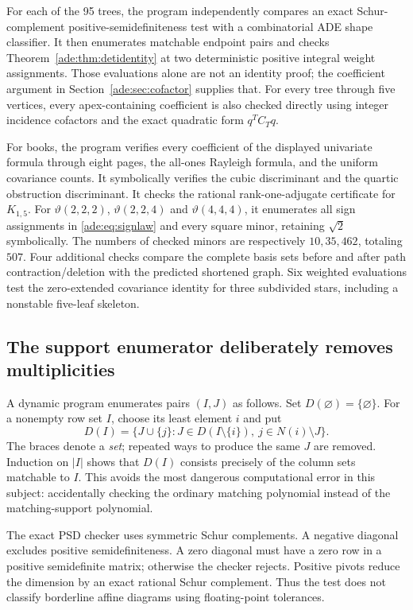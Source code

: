 \documentclass[11pt]{article}
\numberwithin{equation}{section}
\theoremstyle{definition}
\begin{document}
For each of the 95 trees, the program independently compares an exact
Schur-complement positive-semidefiniteness test with a combinatorial ADE
shape classifier.  It then enumerates matchable endpoint pairs and checks
Theorem~\ref{ade:thm:detidentity} at two deterministic positive integral
weight assignments.  Those evaluations alone are not an identity proof;
the coefficient argument in Section~\ref{ade:sec:cofactor} supplies that.
For every tree through five vertices, every apex-containing coefficient
is also checked directly using integer incidence cofactors and the exact
quadratic form $q^TC_Tq$.

For books, the program verifies every coefficient of the displayed
univariate formula through eight pages, the all-ones Rayleigh formula,
and the uniform covariance counts.  It symbolically verifies the cubic
discriminant and the quartic obstruction discriminant.  It checks the
rational rank-one-adjugate certificate for $K_{1,5}$.
For $\vartheta(2,2,2)$, $\vartheta(2,2,4)$ and $\vartheta(4,4,4)$, it enumerates
all sign assignments in \eqref{ade:eq:signlaw} and every square minor,
retaining $\sqrt2$ symbolically.  The numbers of checked minors are
respectively $10,35,462$, totaling $507$.
Four additional checks compare the complete basis sets before and after
path contraction/deletion with the predicted shortened graph.  Six
weighted evaluations test the zero-extended covariance identity for
three subdivided stars, including a nonstable five-leaf skeleton.

\subsection{The support enumerator deliberately removes multiplicities}

A dynamic program enumerates pairs $(I,J)$ as follows.  Set
$D(\varnothing)=\{\varnothing\}$.  For a nonempty row set $I$, choose its
least element $i$ and put
\begin{equation}
 D(I)=\{J\cup\{j\}:J\in D(I\setminus\{i\}),\ j\in N(i)\setminus J\}.
 \label{ade:eq:dp}
\end{equation}
The braces denote a \emph{set}; repeated ways to produce the same $J$
are removed.  Induction on $|I|$ shows that $D(I)$ consists precisely of
the column sets matchable to $I$.  This avoids the most dangerous
computational error in this subject: accidentally checking the ordinary
matching polynomial instead of the matching-support polynomial.

The exact PSD checker uses symmetric Schur complements.  A negative
diagonal excludes positive semidefiniteness.  A zero diagonal must have a
zero row in a positive semidefinite matrix; otherwise the checker rejects.
Positive pivots reduce the dimension by an exact rational Schur
complement.  Thus the test does not classify borderline affine diagrams
using floating-point tolerances.
\end{document}
